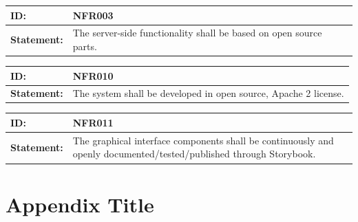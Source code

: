 \documentclass{scrreprt}
\begin{document}
\begin{center}
\begin{tabularx}{\linewidth}{| l | X |}
 \hline
 \textbf{ID:} & NFR003  \\ 
 \hline
 \textbf{Statement:} & The server-side functionality shall be based on open source parts.
 \\ 
 \hline
\end{tabularx}
\end{center}

\begin{center}
\begin{tabularx}{\linewidth}{| l | X |}
 \hline
 \textbf{ID:} & NFR010  \\ 
 \hline
 \textbf{Statement:} & The system shall be developed in open source, Apache 2 license.
 \\ 
 \hline
\end{tabularx}
\end{center}

\begin{center}
\begin{tabularx}{\linewidth}{| l | X |}
 \hline
 \textbf{ID:} & NFR011  \\ 
 \hline
 \textbf{Statement:} & The graphical interface components shall be continuously and openly documented/tested/published through Storybook.
 \\ 
 \hline
\end{tabularx}
\end{center}


\appendix
\chapter{Appendix Title}

\end{document}
